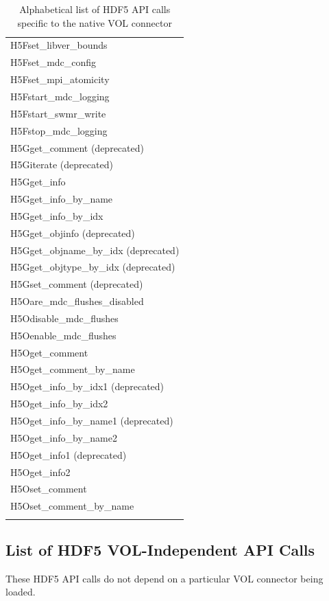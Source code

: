 \begin{longtable}{ |>{\raggedright\arraybackslash}p{\linewidth}| }
    H5Fset\_libver\_bounds \\
    H5Fset\_mdc\_config \\
    H5Fset\_mpi\_atomicity \\
    H5Fstart\_mdc\_logging \\
    H5Fstart\_swmr\_write \\
    H5Fstop\_mdc\_logging \\
    \hline
    H5Gget\_comment (deprecated) \\
    H5Giterate (deprecated) \\
    H5Gget\_info \\
    H5Gget\_info\_by\_name \\
    H5Gget\_info\_by\_idx \\
    H5Gget\_objinfo (deprecated) \\
    H5Gget\_objname\_by\_idx (deprecated) \\
    H5Gget\_objtype\_by\_idx (deprecated) \\
    H5Gset\_comment (deprecated) \\
    \hline
    H5Oare\_mdc\_flushes\_disabled \\
    H5Odisable\_mdc\_flushes \\
    H5Oenable\_mdc\_flushes \\
    H5Oget\_comment \\
    H5Oget\_comment\_by\_name \\
    H5Oget\_info\_by\_idx1 (deprecated) \\
    H5Oget\_info\_by\_idx2 \\
    H5Oget\_info\_by\_name1 (deprecated) \\
    H5Oget\_info\_by\_name2 \\
    H5Oget\_info1 (deprecated) \\
    H5Oget\_info2 \\
    H5Oset\_comment \\
    H5Oset\_comment\_by\_name \\
    \hline
\caption{Alphabetical list of HDF5 API calls specific to the native VOL connector}
\end{longtable}

\subsection{List of HDF5 VOL-Independent API Calls}

These HDF5 API calls do not depend on a particular VOL connector being loaded.

